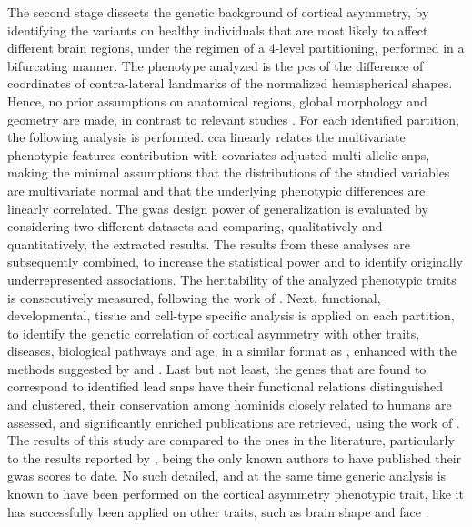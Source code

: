 The second stage dissects the genetic background of cortical asymmetry, by identifying the variants on healthy individuals that are most likely to affect different brain regions, under the regimen of a 4-level partitioning, performed in a bifurcating manner. The phenotype analyzed is the \acp{pc} of the difference of coordinates of contra-lateral landmarks of the normalized hemispherical shapes. Hence, no prior assumptions on anatomical regions, global morphology and geometry are made, in contrast to relevant studies \cite{Kong2022,Zhao2022}. For each identified partition, the following analysis is performed. \Ac{cca} linearly relates the multivariate phenotypic features contribution with covariates adjusted multi-allelic \acp{snp}, making the minimal assumptions that the distributions of the studied variables are multivariate normal and that the underlying phenotypic differences are linearly correlated. The \ac{gwas} design power of generalization is evaluated by considering two different datasets and comparing, qualitatively and quantitatively, the extracted results. The results from these analyses are subsequently combined, to increase the statistical power and to identify originally underrepresented associations. The heritability of the analyzed phenotypic traits is consecutively measured, following the work of \citet{Bulik-Sullivan2015}. Next, functional, developmental, tissue and cell-type specific analysis is applied on each partition, to identify the genetic correlation of cortical asymmetry with other traits, diseases, biological pathways and age, in a similar format as \citet{Sha2021}, enhanced with the methods suggested by \citet{McLean2010} and \citet{Finucane2018}. Last but not least, the genes that are found to correspond to identified lead \acp{snp} have their functional relations distinguished and clustered, their conservation among hominids closely related to humans are assessed, and significantly enriched publications are retrieved, using the work of \citet{Szklarczyk2021}. The results of this study are compared to the ones in the literature, particularly to the results reported by \citet{Sha2021}, being the only known authors to have published their \ac{gwas} scores to date. No such detailed, and at the same time generic analysis is known to have been performed on the cortical asymmetry phenotypic trait, like it has successfully been applied on other traits, such as brain shape \cite{Naqvi2021} and face \cite{Claes2018}.